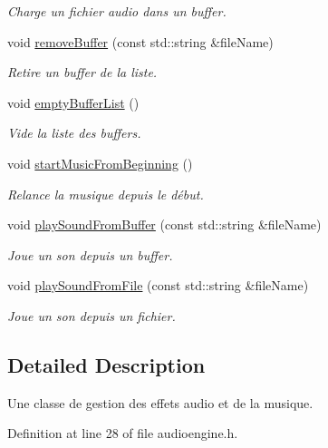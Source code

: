 \begin{DoxyCompactItemize}
\begin{DoxyCompactList}\small\item\em Charge un fichier audio dans un buffer. \end{DoxyCompactList}\item 
void \hyperlink{classns_audio_1_1_audio_engine_a2b0a1a9b1cb90e1180ddedb5b9e2fad1}{remove\+Buffer} (const std\+::string \&file\+Name)
\begin{DoxyCompactList}\small\item\em Retire un buffer de la liste. \end{DoxyCompactList}\item 
void \hyperlink{classns_audio_1_1_audio_engine_ac05b3e0d2fd9ecfd1ad8eb110f021bf3}{empty\+Buffer\+List} ()
\begin{DoxyCompactList}\small\item\em Vide la liste des buffers. \end{DoxyCompactList}\item 
void \hyperlink{classns_audio_1_1_audio_engine_ac1343ed3afe38eb80a222969f3d74d6d}{start\+Music\+From\+Beginning} ()
\begin{DoxyCompactList}\small\item\em Relance la musique depuis le début. \end{DoxyCompactList}\item 
void \hyperlink{classns_audio_1_1_audio_engine_a47d769cc331578a398f422ff497505c8}{play\+Sound\+From\+Buffer} (const std\+::string \&file\+Name)
\begin{DoxyCompactList}\small\item\em Joue un son depuis un buffer. \end{DoxyCompactList}\item 
void \hyperlink{classns_audio_1_1_audio_engine_aa541e8088c35ab41e4747ecd648e75e9}{play\+Sound\+From\+File} (const std\+::string \&file\+Name)
\begin{DoxyCompactList}\small\item\em Joue un son depuis un fichier. \end{DoxyCompactList}\end{DoxyCompactItemize}


\subsection{Detailed Description}
Une classe de gestion des effets audio et de la musique. 

Definition at line 28 of file audioengine.\+h.



